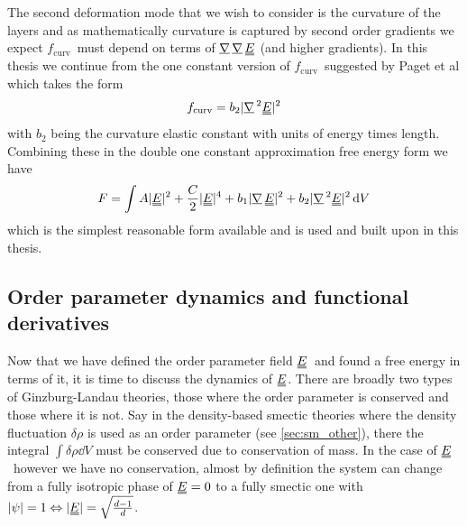\documentclass[12pt]{article}
\newcommand{\suf}[2]{\stackunder[0.5pt]{\stackunder[1pt]{\ensuremath{#1}}{\rule{\widthof{\ensuremath{#2}}*\real{0.9}}{.1ex}}}{}}
\newcommand{\duf}[2]{\stackunder[0.5pt]{\stackunder[0.8pt]{\stackunder[1pt]{\ensuremath{#1}}{\rule{\widthof{\ensuremath{#2}}*\real{0.9}}{.1ex}}}{\rule{\widthof{\ensuremath{#2}}*\real{0.9}}{.1ex}}}{}}
\newcommand{\du}[1]{\duf{#1}{#1}}
\newcommand{\mgrad}{\ensuremath{\suf{\nabla}{K}\,}}
\newcommand{\EE}{\ensuremath{\du{E}}}
\newcommand{\FU}{\ensuremath{f_\text{curv}}}
\begin{document}
        The second deformation mode that we wish to consider is the curvature of the layers and as mathematically curvature is captured by second order gradients we expect \FU\ must depend on terms of $\mgrad\mgrad\EE$ (and higher gradients).
        In this thesis we continue from the one constant version of \FU\ suggested by Paget et al which takes the form
        \begin{equation}
            \FU = b_2 |\mgrad^2 \EE|^2
        \end{equation}
        with $b_2$ being the curvature elastic constant with units of energy times length.
        Combining these in the double one constant approximation free energy form we have
        \begin{equation}\label{eq:Foca}
            F = \int A |\du{E}|^2 + \frac{C}{2}|\du{E}|^4 + b_1 |\mgrad \EE|^2 + b_2 |\mgrad^2 \EE|^2 \dd{V}
        \end{equation}
        which is the simplest reasonable form available and is used and built upon in this thesis.

    \subsection{Order parameter dynamics and functional derivatives}
        Now that we have defined the order parameter field \EE\ and found a free energy in terms of it, it is time to discuss the dynamics of \EE.
        There are broadly two types of Ginzburg-Landau theories, those where the order parameter is conserved and those where it is not.
        Say in the density-based smectic theories where the density fluctuation $\delta\rho$ is used as an order parameter (see \cref{sec:sm_other}), there the integral $\int \delta\rho \dd{V}$ must be conserved due to conservation of mass.
        In the case of \EE\ however we have no conservation, almost by definition the system can change from a fully isotropic phase of $\EE=0$ to a fully smectic one with $|\psi|=1 \Leftrightarrow |\EE| = \sqrt{\frac{d-1}{d}}$.
\end{document}
